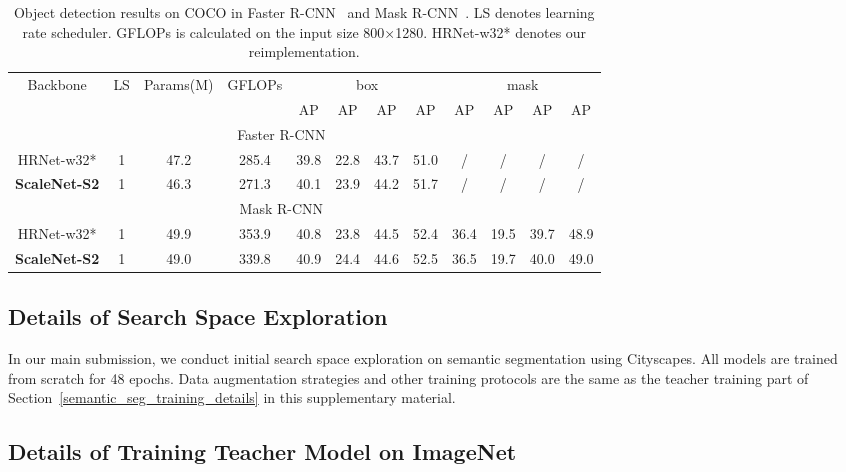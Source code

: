\documentclass[final]{cvpr}
\newcommand{\netname}{ScaleNet\xspace}
\begin{document}
\begin{table*}[t]
\centering
\caption{Object detection results on COCO  in Faster R-CNN~\cite{ren2015faster} and Mask R-CNN~\cite{he2017mask}. LS denotes learning rate scheduler. GFLOPs is calculated on the input size 800×1280. HRNet-w32* denotes our reimplementation.} 
\begin{tabular}{c|c|c|c|cccc|cccc} 
\hline
\multirow{2}{*}{Backbone}  & \multirow{2}{*}{LS} & \multirow{2}{*}{Params(M)} & \multirow{2}{*}{GFLOPs}   & \multicolumn{4}{|c|}{box}& \multicolumn{4}{c}{mask}\\
\cline{5-12}
&&& & AP   & AP  & AP  & AP  & AP  & AP & AP & AP   \\ 
\hline 
\multicolumn{11}{c}{Faster R-CNN~\cite{ren2015faster}} \\
\hline

HRNet-w32*    &  1 & 47.2  & 285.4 & 39.8 & 22.8 & 43.7 & 51.0 & / & /& /& / \\
\textbf{\netname-S2}  & 1 & 46.3  &  271.3 & 40.1  & 23.9  & 44.2  & 51.7  & / &/ & /& /     \\

\hline 
\multicolumn{11}{c}{Mask R-CNN~\cite{he2017mask}} \\
\hline
HRNet-w32*   & 1 &  49.9 &  353.9  &  40.8 & 23.8 & 44.5 & 52.4 & 36.4 & 19.5 & 39.7  & 48.9 \\
\textbf{\netname-S2}  &   1  & 49.0  &  339.8  & 40.9 & 24.4 & 44.6 & 52.5 & 36.5 & 19.7 & 40.0  & 49.0   \\
\hline
\end{tabular}



\label{tab:object_detection}
\end{table*}


\subsection{Details of Search Space Exploration}
In our main submission, we conduct initial search space exploration on semantic segmentation using Cityscapes. All models are trained from scratch for 48 epochs. Data augmentation strategies and other training protocols are the same as the teacher training part of Section~\ref{semantic_seg_training_details} in this supplementary material.

\subsection{Details of Training Teacher Model on ImageNet}
\end{document}
